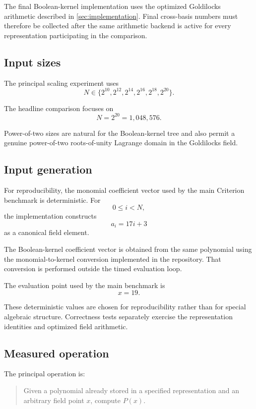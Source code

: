 The final Boolean-kernel implementation uses the optimized Goldilocks
arithmetic described in \cref{sec:implementation}. Final cross-basis
numbers must therefore be collected after the same arithmetic backend is
active for every representation participating in the comparison.

\subsection{Input sizes}

The principal scaling experiment uses
\[
N\in
\{
2^{10},
2^{12},
2^{14},
2^{16},
2^{18},
2^{20}
\}.
\]

The headline comparison focuses on
\[
N=2^{20}=1{,}048{,}576.
\]

Power-of-two sizes are natural for the Boolean-kernel tree and also permit
a genuine power-of-two roots-of-unity Lagrange domain in the Goldilocks
field.

\subsection{Input generation}

For reproducibility, the monomial coefficient vector used by the main
Criterion benchmark is deterministic. For
\[
0\le i<N,
\]
the implementation constructs
\[
a_i=17i+3
\]
as a canonical field element.

The Boolean-kernel coefficient vector is obtained from the same polynomial
using the monomial-to-kernel conversion implemented in the repository.
That conversion is performed outside the timed evaluation loop.

The evaluation point used by the main benchmark is
\[
x=19.
\]

These deterministic values are chosen for reproducibility rather than for
special algebraic structure. Correctness tests separately exercise the
representation identities and optimized field arithmetic.

\subsection{Measured operation}

The principal operation is:

\begin{quote}
Given a polynomial already stored in a specified representation and an
arbitrary field point \(x\), compute \(P(x)\).
\end{quote}

